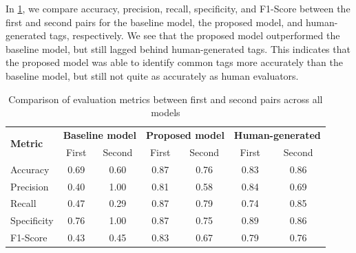 In \cref{tab:metrics_comparison_combined}, we compare accuracy, precision, recall, specificity, and F1-Score between the first and second pairs for the baseline model, the proposed model, and human-generated tags, respectively. We see that the proposed model outperformed the baseline model, but still lagged behind human-generated tags. This indicates that the proposed model was able to identify common tags more accurately than the baseline model, but still not quite as accurately as human evaluators.

\begin{table}[h]
    \centering
    \begin{tabular}{lcccccc}
        \hline
        \multirow{2}{*}{\textbf{Metric}} & \multicolumn{2}{c}{\textbf{Baseline model}} & \multicolumn{2}{c}{\textbf{Proposed model}} & \multicolumn{2}{c}{\textbf{Human-generated}}                           \\
        \cline{2-7}
                                         & First                                 & Second                                      & First                                        & Second & First & Second \\
        \hline
        Accuracy                         & 0.69                                  & 0.60                                        & 0.87                                         & 0.76   & 0.83  & 0.86   \\
        Precision                        & 0.40                                  & 1.00                                        & 0.81                                         & 0.58   & 0.84  & 0.69   \\
        Recall                           & 0.47                                  & 0.29                                        & 0.87                                         & 0.79   & 0.74  & 0.85   \\
        Specificity                      & 0.76                                  & 1.00                                        & 0.87                                         & 0.75   & 0.89  & 0.86   \\
        F1-Score                         & 0.43                                  & 0.45                                        & 0.83                                         & 0.67   & 0.79  & 0.76   \\
        \hline
    \end{tabular}
    \caption{Comparison of evaluation metrics between first and second pairs across all models}
    \label{tab:metrics_comparison_combined}
\end{table}

